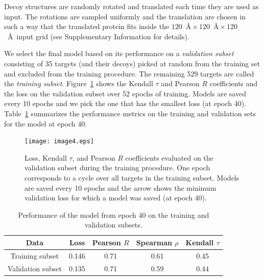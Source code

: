 \documentclass{bioinfo}
\begin{document}
Decoy structures are randomly rotated and translated each time they
are used as input. The rotations are sampled uniformly
\citep{shoemake1992uniform} and the translation are chosen in such a
way that the translated protein fits inside the $120$~\AA${}\times
120$~\AA${}\times 120$~\AA\ input grid (see Supplementary Information for
details).

We select the final model based on its performance on a
\emph{validation subset} consisting of 35 targets (and their decoys)
picked at random from the training set and excluded from the training
procedure. The remaining 529 targets are called the \emph{training
subset}.  Figure~\ref{Fig:TrainingLoss} shows the Kendall $\tau$ and
Pearson $R$ coefficients and the loss on the validation subset over 52
epochs of training.  Models are saved every 10 epochs and we pick the
one that has the smallest loss (at epoch 40).
Table~\ref{Tbl:TrainingResults} summarizes the performance metrics on
the training and validation sets for the model at epoch 40.

\begin{figure}[!tpb]
    \centering
    \texttt{[image: image4.eps]}
    \caption{Loss, Kendall $\tau$, and Pearson $R$ coefficients
      evaluated on the validation subset during the training
      procedure.  One epoch corresponds to a cycle over all targets in
      the training subset. Models are saved every 10 epochs and the
      arrow shows the minimum validation loss for which a model was
      saved (at epoch 40).}
    \label{Fig:TrainingLoss}
\end{figure}

\begin{table}[!t]
\begin{center}
\begin{tabular}{ c | c | c | c | c }
    Data & Loss & Pearson $R$ & Spearman $\rho$ & Kendall $\tau$ \\
    \hline
    Training subset     &0.146 &0.71 &0.61 &0.45 \\
    Validation subset   &0.135 &0.71 &0.59 &0.44 \\ \hline
\end{tabular}
    \caption {Performance of the model from epoch 40 on the training
      and validation subsets.}
    \label{Tbl:TrainingResults}
\end{center}
\end{table}
\end{document}
